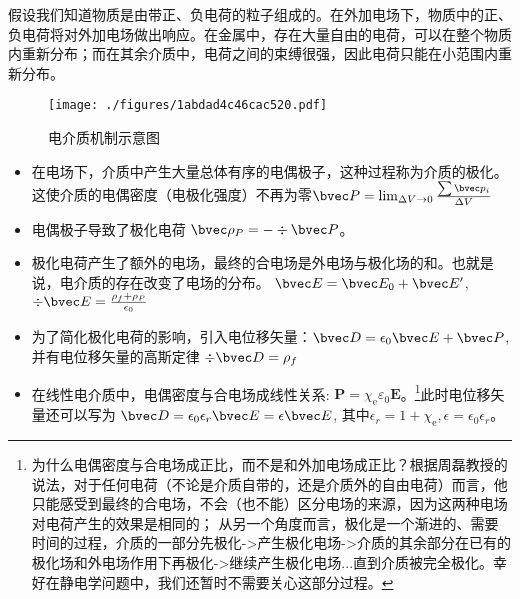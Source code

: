 
假设我们知道物质是由带正、负电荷的粒子组成的。在外加电场下，物质中的正、负电荷将对外加电场做出响应。在金属中，存在大量自由的电荷，可以在整个物质内重新分布；而在其余介质中，电荷之间的束缚很强，因此电荷只能在小范围内重新分布。

\begin{figure}[ht]
\centering
\texttt{[image: ./figures/1abdad4c46cac520.pdf]}
\caption{电介质机制示意图} \label{fig_DLT_1}
\end{figure}
\begin{itemize}
\item 在电场下，介质中产生大量总体有序的电偶极子，这种过程称为介质的极化。这使介质的电偶密度（电极化强度）不再为零$\bvec P = \lim_{\Delta V \to 0} \frac{\sum \bvec p_i}{\Delta V}$ 
\item 电偶极子导致了极化电荷 $\bvec \rho_P = - \div \bvec P$。
\item 极化电荷产生了额外的电场，最终的合电场是外电场与极化场的和。也就是说，电介质的存在改变了电场的分布。 $\bvec E = \bvec E_0 + \bvec E'$, $\div \bvec E = \frac{\rho_f+\rho_P}{\epsilon_0}$
\item 为了简化极化电荷的影响，引入电位移矢量：$\bvec D = \epsilon_0 \bvec E + \bvec P$,并有电位移矢量的高斯定律 $\div \bvec D = \rho_f$ 
\item 在线性电介质中，电偶密度与合电场成线性关系: $\mathbf P=\chi_{\mathrm e} \varepsilon_{0} \mathbf E$。\footnote{为什么电偶密度与合电场成正比，而不是和外加电场成正比？根据周磊教授的说法，对于任何电荷（不论是介质自带的，还是介质外的自由电荷）而言，他只能感受到最终的合电场，不会（也不能）区分电场的来源，因为这两种电场对电荷产生的效果是相同的；
从另一个角度而言，极化是一个渐进的、需要时间的过程，介质的一部分先极化->产生极化电场->介质的其余部分在已有的极化场和外电场作用下再极化->继续产生极化电场...直到介质被完全极化。幸好在静电学问题中，我们还暂时不需要关心这部分过程。}此时电位移矢量还可以写为 $\bvec D = \epsilon_0 \epsilon_r \bvec E = \epsilon \bvec E $, 其中$\epsilon_r = 1+\chi_{\mathrm e}, \epsilon = \epsilon_0 \epsilon_r$。
\end{itemize}
